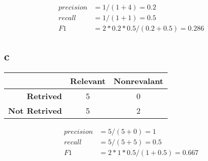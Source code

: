 \documentclass[11pt]{article} %
\begin{document}
\begin{align*}
    precision &= 1/(1+4) = 0.2\\
    recall &= 1/(1+1) = 0.5\\
    F1 &= 2*0.2*0.5/(0.2+0.5) = 0.286
\end{align*}

\subsection*{c}

\begin{table}[h]
    \begin{center}
        \begin{tabular}{r|c|c|}
            & \textbf{Relevant} & \textbf{Nonrevalant}\\
            \hline
            \textbf{Retrived} & 5 & 0\\
            \textbf{Not Retrived} & 5 & 2\\
        \end{tabular}
    \end{center}
\end{table}

\begin{align*}
    precision &= 5/(5+0) = 1\\
    recall &= 5/(5+5) = 0.5\\
    F1 &= 2*1*0.5/(1+0.5) = 0.667
\end{align*}
\end{document}
